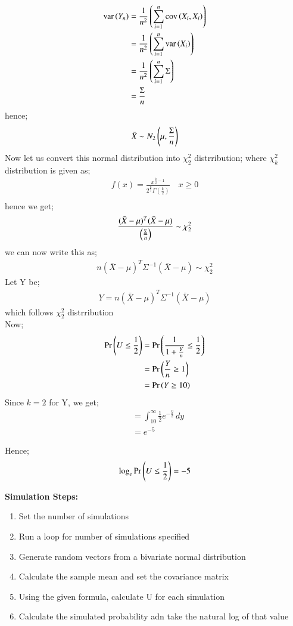 \documentclass[journal,12pt,onecolumn]{IEEEtran}
\theoremstyle{remark}
\begin{document}
\begin{align}
    \text{var}\left(Y_n\right) &= \frac{1}{n^2} \left(\sum_{i=1}^{n} \text{cov}\left(X_i, X_i\right)\right)\\
     &= \frac{1}{n^2} \left(\sum_{i=1}^{n} \text{var}\left(X_i\right)\right)\\
     &= \frac{1}{n^2} \left(\sum_{i=1}^{n} \Sigma\right)\\
     &= \frac{\Sigma}{n}
\end{align}
hence;
\begin{align}
    \bar{X} \sim N_2\left(\mu,\frac{\Sigma}{n}\right)
\end{align}
Now let us convert this normal distribution into $\chi^{2}_{2}$ distrribution; where $\chi^{2}_{k}$ distribution is given as;
\begin{align}
    f(x) = \frac{x^{\frac{k}{2}-1}}{2^{\frac{k}{2}}\Gamma(\frac{k}{2})} \quad  x \ge 0\\
\end{align}
hence we get;
\begin{align}
    \frac{(\bar{X}-\mu)^T(\bar{X}-\mu)}{\left(\frac{\Sigma}{n}\right)} \sim \chi^{2}_{2}
\end{align}
we can now write this as;
\begin{align}
    n(\bar{X} - \mu)^T\Sigma^{-1}(\bar{X} - \mu) \sim \chi^{2}_{2}
\end{align}
Let Y be;
\begin{align}
    Y = n(\bar{X} - \mu)^T\Sigma^{-1}(\bar{X} - \mu)
\end{align}
which follows $\chi^{2}_{2}$ distrribution\\
Now;
\begin{align}
    \Pr\left(U \le \frac{1}{2}\right)
    &= \Pr\left(\frac{1}{1+\frac{Y}{n}} \le \frac{1}{2}\right)\\
    &= \Pr\left(\frac{Y}{n} \ge 1\right)\\
    &= \Pr\left(Y \ge 10\right)
\end{align}
Since $k=2$ for Y, we get;
\begin{align}
    &= \int_{10}^{\infty} \frac{1}{2}e^{-\frac{y}{2}} \,dy\\
    &= e^{-5}   
\end{align}

Hence;
\begin{align}
    \log_e \Pr\left(U \le \frac{1}{2}\right) = -5
\end{align}

\textbf{Simulation Steps:}
\begin{enumerate}
    \item Set the number of simulations
    \item Run a loop for number of simulations specified
    \item Generate random vectors from a bivariate normal distribution
    \item Calculate the sample mean and set the covariance matrix
    \item Using the given formula, calculate U for each simulation
    \item Calculate the simulated probability adn take the natural log of that value
\end{enumerate}
\end{document}
